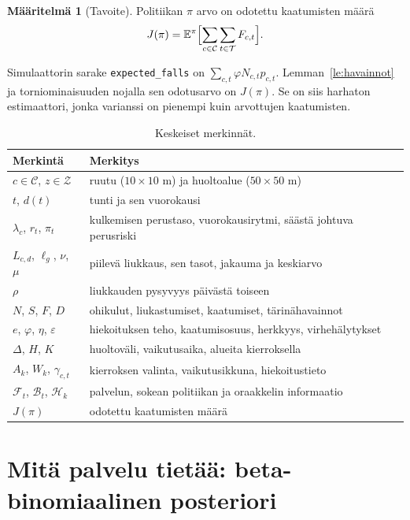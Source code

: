 \documentclass[11pt,a4paper]{article}
\theoremstyle{plain}
\theoremstyle{definition}
\newtheorem{maaritelma}{Määritelmä}
\theoremstyle{remark}
\newcommand{\E}{\mathbb{E}}
\newcommand{\cC}{\mathcal{C}}
\newcommand{\cZ}{\mathcal{Z}}
\newcommand{\cT}{\mathcal{T}}
\newcommand{\cF}{\mathcal{F}}
\newcommand{\cB}{\mathcal{B}}
\newcommand{\cH}{\mathcal{H}}
\newcommand{\1}{\mathbf{1}}
\begin{document}
\begin{maaritelma}[Tavoite]
Politiikan $\pi$ arvo on odotettu kaatumisten määrä
\[
  J(\pi) = \E^\pi\Bigl[\sum_{c \in \cC} \sum_{t \in \cT} F_{c,t}\Bigr].
\]
\end{maaritelma}

Simulaattorin sarake \texttt{expected\_falls} on $\sum_{c,t} \varphi N_{c,t} p_{c,t}$.
Lemman~\ref{le:havainnot} ja torniominaisuuden nojalla sen odotusarvo on
$J(\pi)$. Se on siis harhaton estimaattori, jonka varianssi on pienempi kuin
arvottujen kaatumisten.

\begin{table}[ht]
\centering
\small
\begin{tabular}{@{}l l@{}}
\toprule
Merkintä & Merkitys \\
\midrule
$c \in \cC$, $z \in \cZ$ & ruutu ($10 \times 10$ m) ja huoltoalue ($50 \times 50$ m) \\
$t$, $d(t)$ & tunti ja sen vuorokausi \\
$\lambda_c$, $r_t$, $\pi_t$ & kulkemisen perustaso, vuorokausirytmi, säästä johtuva perusriski \\
$L_{c,d}$, $\ell_g$, $\nu$, $\mu$ & piilevä liukkaus, sen tasot, jakauma ja keskiarvo \\
$\rho$ & liukkauden pysyvyys päivästä toiseen \\
$N$, $S$, $F$, $D$ & ohikulut, liukastumiset, kaatumiset, tärinähavainnot \\
$e$, $\varphi$, $\eta$, $\varepsilon$ & hiekoituksen teho, kaatumisosuus, herkkyys, virhehälytykset \\
$\Delta$, $H$, $K$ & huoltoväli, vaikutusaika, alueita kierroksella \\
$A_k$, $W_k$, $\gamma_{c,t}$ & kierroksen valinta, vaikutusikkuna, hiekoitustieto \\
$\cF_t$, $\cB_t$, $\cH_k$ & palvelun, sokean politiikan ja oraakkelin informaatio \\
$J(\pi)$ & odotettu kaatumisten määrä \\
\bottomrule
\end{tabular}
\caption{Keskeiset merkinnät.}
\label{tab:merkinnat}
\end{table}

\section{Mitä palvelu tietää: beta-binomiaalinen posteriori}\label{sec:posteriori}
\end{document}
